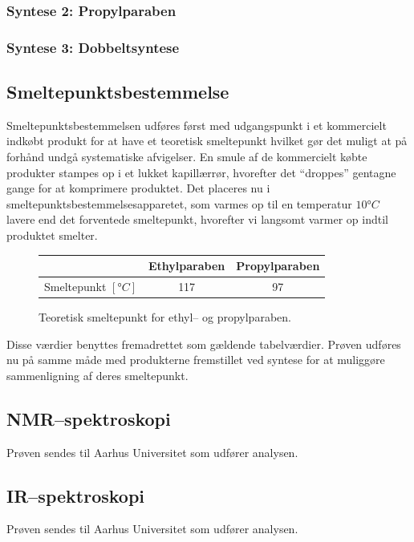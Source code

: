     \subsubsection{Syntese 2: Propylparaben}
    

    \subsubsection{Syntese 3: Dobbeltsyntese}
        

    \subsection{Smeltepunktsbestemmelse}
    Smeltepunktsbestemmelsen udføres først med udgangspunkt i et kommercielt indkøbt produkt for at have et teoretisk smeltepunkt hvilket gør det muligt at på forhånd undgå systematiske afvigelser. En smule af de kommercielt købte produkter stampes op i et lukket kapillærrør, hvorefter det ``droppes'' gentagne gange for at komprimere produktet. Det placeres nu i smeltepunktsbestemmelsesapparetet, som varmes op til en temperatur $10\si{\degree C}$ lavere end det forventede smeltepunkt, hvorefter vi langsomt varmer op indtil produktet smelter.
    \begin{figure}[H]\centering
        \caption{Teoretisk smeltepunkt for ethyl-- og propylparaben.}
        \begin{tabular}{ccc}
            \toprule
            & Ethylparaben & Propylparaben \\
            \midrule
            Smeltepunkt $\left[\si{\degree C}\right]$ & 117 & 97 \\
            \bottomrule
        \end{tabular}
    \end{figure}
    Disse værdier benyttes fremadrettet som gældende tabelværdier. Prøven udføres nu på samme måde med produkterne fremstillet ved syntese for at muliggøre sammenligning af deres smeltepunkt.

    \subsection{NMR--spektroskopi}
    Prøven sendes til Aarhus Universitet som udfører analysen.

    \subsection{IR--spektroskopi}
    Prøven sendes til Aarhus Universitet som udfører analysen.

